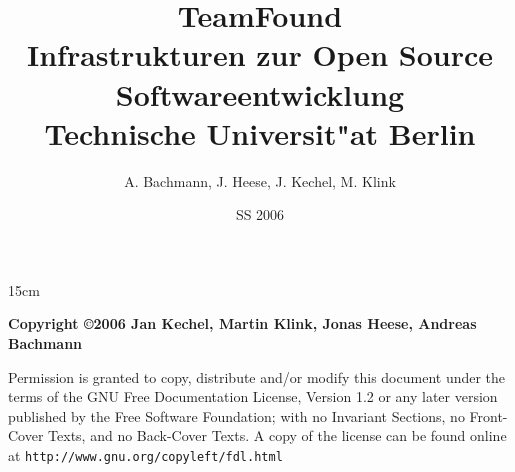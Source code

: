 \documentclass[12pt,a4paper]{report}
\begin{document}
{}
%
\title{TeamFound\\Infrastrukturen zur Open Source Softwareentwicklung\\Technische Universit"at Berlin}
\author{A. Bachmann, J. Heese, J. Kechel, M. Klink}
\date{SS 2006}
%
\maketitle
%
\begin{parbox}[b][17cm][s]{15cm}

\textbf{Copyright \copyright 2006 Jan Kechel, Martin Klink, Jonas Heese, Andreas Bachmann}

Permission is granted to copy, distribute and/or modify this document
under the terms of the GNU Free Documentation License, Version 1.2
or any later version published by the Free Software Foundation;
with no Invariant Sections, no Front-Cover Texts, and no Back-Cover
Texts.  A copy of the license can be found online at \texttt{http://www.gnu.org/copyleft/fdl.html}
\end{parbox}

%
\tableofcontents
\listoffigures
\cleardoublepage
%
%
%



%
%
%
%
\end{document}
